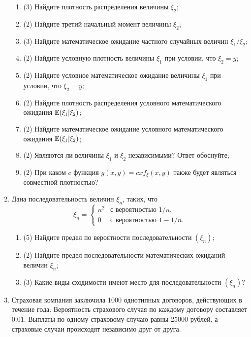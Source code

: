 \begin{enumerate}
  \begin{enumerate}
      \item (3) Найдите
   плотность распределения величины $\xi_2$;
      \item (2) Найдите
   третий начальный момент величины $\xi_2$;
      \item (3) Найдите
   математическое ожидание частного случайных величин $\xi_1/\xi_2$;
      \item (2) Найдите условную плотность величины $\xi_1$ при условии, что $\xi_2=y$; 
      \item (2) Найдите условное математическое ожидание величины $\xi_1$ при условии, что $\xi_2=y$; 
      \item (2) Найдите плотность распределения условного математического ожидания $\operatorname{\mathbb{E}}(\xi_1|\xi_2)$;
      \item (2) Найдите
   математическое ожидание условного математического ожидания $\operatorname{\mathbb{E}}(\xi_1|\xi_2)$; 
      \item (2) Являются ли величины $\xi_1$ и $\xi_2$ независимыми? Ответ обоснуйте;
      \item (2) При каком $c$ функция $g(x,y)=c x f_{\xi}(x,y)$ также будет являться совместной плотностью? 
  \end{enumerate}
  
  \item Дана последовательность величин ${\xi_n}$, таких, что
  \[
  \xi_n =      \begin{cases}
                       n^2           &   \text{с вероятностью  } 1/n, \\
                       0     &   \text{с вероятностью  } 1-1/n.
                    \end{cases}
  \]
  
  \begin{enumerate}
  \item (5) Найдите предел по вероятности последовательности $(\xi_n)$;
  \item (2) Найдите предел последовательности математических ожиданий величин $\xi_n$;
  \item (3) Какие виды сходимости имеют место для последовательности $(\xi_n)$?
  \end{enumerate}
  
  \item Страховая компания заключила 1000 однотипных договоров, действующих в течение года. 
  Вероятность страхового случая по каждому договору составляет $0.01$. 
  Выплаты по одному страховому случаю равны 25000 рублей, 
  а страховые случаи происходят независимо друг от друга. 
  

\end{enumerate}
